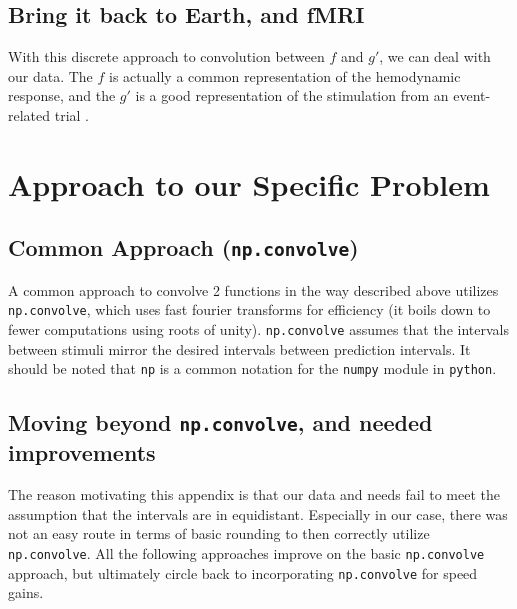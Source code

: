 \documentclass[11pt]{article}
\begin{document}



\subsection{Bring it back to Earth, and fMRI}

With this discrete approach to convolution between $f$ and $g'$, we can deal with our data. The $f$ is actually a common representation of the hemodynamic response, and the $g'$ is a good representation of the stimulation from an event-related trial \cite{brett2015course}. 

\section{Approach to our Specific Problem}

\subsection{Common Approach (\texttt{np.convolve})}

A common approach to convolve 2 functions in the way described above 
utilizes \texttt{np.convolve}, which uses fast fourier transforms for 
efficiency (it boils down to fewer computations using roots of unity). 
\texttt{np.convolve} assumes that the intervals between stimuli mirror the 
desired intervals between prediction intervals. It should be noted that 
\texttt{np} is a common notation for the \texttt{numpy} module in 
\texttt{python}.

\subsection{Moving beyond \texttt{np.convolve}, and needed improvements}

The reason motivating this appendix is that our data and needs fail to meet 
the assumption that the intervals are in equidistant. Especially in our case, 
there was not an easy route in terms of basic rounding to then correctly utilize 
\texttt{np.convolve}. All the following approaches improve on the basic 
\texttt{np.convolve} approach, but ultimately circle back to incorporating 
\texttt{np.convolve} for speed gains. 
\end{document}
